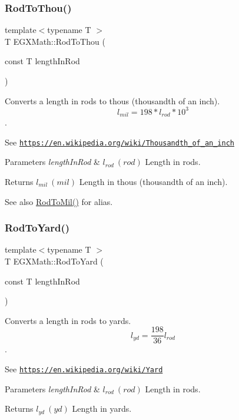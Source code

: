 \subsubsection{\texorpdfstring{Rod\+To\+Thou()}{RodToThou()}}
{\footnotesize\ttfamily template$<$typename T $>$ \\
T E\+G\+X\+Math\+::\+Rod\+To\+Thou (\begin{DoxyParamCaption}\item[{const T}]{length\+In\+Rod }\end{DoxyParamCaption})}



Converts a length in rods to thous (thousandth of an inch). \[ l_{mil}= 198 * l_{rod} * 10^{3} \]. 

See \href{https://en.wikipedia.org/wiki/Thousandth_of_an_inch}{\tt https\+://en.\+wikipedia.\+org/wiki/\+Thousandth\+\_\+of\+\_\+an\+\_\+inch} 
\begin{DoxyParams}{Parameters}
{\em length\+In\+Rod} & $ l_{rod}\ (rod)$ Length in rods. \\
\hline
\end{DoxyParams}
\begin{DoxyReturn}{Returns}
$ l_{mil}\ (mil)$ Length in thous (thousandth of an inch). 
\end{DoxyReturn}
\begin{DoxySeeAlso}{See also}
\mbox{\hyperlink{group___e_g_x_math-_conversions-_length_conversions-_imperial-_rod-_imperial_ga8458f45f5b02b4127d0d5626422b17c3}{Rod\+To\+Mil()}} for alias. 
\end{DoxySeeAlso}
\mbox{\label{group___e_g_x_math-_conversions-_length_conversions-_imperial-_rod-_imperial_gaf9c279c2819bf2c950dcde7a67849bf6}} 
\subsubsection{\texorpdfstring{Rod\+To\+Yard()}{RodToYard()}}
{\footnotesize\ttfamily template$<$typename T $>$ \\
T E\+G\+X\+Math\+::\+Rod\+To\+Yard (\begin{DoxyParamCaption}\item[{const T}]{length\+In\+Rod }\end{DoxyParamCaption})}



Converts a length in rods to yards. \[ l_{yd}= \frac{198}{36} l_{rod} \]. 

See \href{https://en.wikipedia.org/wiki/Yard}{\tt https\+://en.\+wikipedia.\+org/wiki/\+Yard} 
\begin{DoxyParams}{Parameters}
{\em length\+In\+Rod} & $ l_{rod}\ (rod)$ Length in rods. \\
\hline
\end{DoxyParams}
\begin{DoxyReturn}{Returns}
$ l_{yd}\ (yd)$ Length in yards. 
\end{DoxyReturn}
